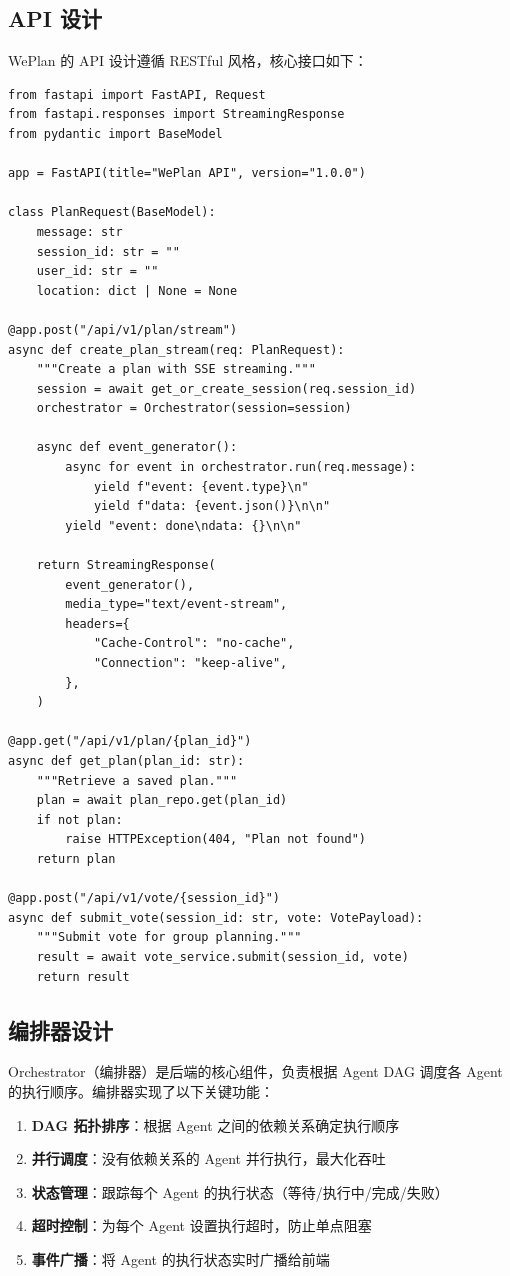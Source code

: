 \documentclass[12pt,a4paper]{ctexart}
\begin{document}
\subsection{API 设计}

WePlan 的 API 设计遵循 RESTful 风格，核心接口如下：

\begin{lstlisting}[caption={FastAPI 核心路由},label={lst:fastapi-routes}]
from fastapi import FastAPI, Request
from fastapi.responses import StreamingResponse
from pydantic import BaseModel

app = FastAPI(title="WePlan API", version="1.0.0")

class PlanRequest(BaseModel):
    message: str
    session_id: str = ""
    user_id: str = ""
    location: dict | None = None

@app.post("/api/v1/plan/stream")
async def create_plan_stream(req: PlanRequest):
    """Create a plan with SSE streaming."""
    session = await get_or_create_session(req.session_id)
    orchestrator = Orchestrator(session=session)

    async def event_generator():
        async for event in orchestrator.run(req.message):
            yield f"event: {event.type}\n"
            yield f"data: {event.json()}\n\n"
        yield "event: done\ndata: {}\n\n"

    return StreamingResponse(
        event_generator(),
        media_type="text/event-stream",
        headers={
            "Cache-Control": "no-cache",
            "Connection": "keep-alive",
        },
    )

@app.get("/api/v1/plan/{plan_id}")
async def get_plan(plan_id: str):
    """Retrieve a saved plan."""
    plan = await plan_repo.get(plan_id)
    if not plan:
        raise HTTPException(404, "Plan not found")
    return plan

@app.post("/api/v1/vote/{session_id}")
async def submit_vote(session_id: str, vote: VotePayload):
    """Submit vote for group planning."""
    result = await vote_service.submit(session_id, vote)
    return result
\end{lstlisting}

\subsection{编排器设计}

Orchestrator（编排器）是后端的核心组件，负责根据 Agent DAG 调度各 Agent 的执行顺序。编排器实现了以下关键功能：

\begin{enumerate}[leftmargin=2em]
  \item \textbf{DAG 拓扑排序}：根据 Agent 之间的依赖关系确定执行顺序
  \item \textbf{并行调度}：没有依赖关系的 Agent 并行执行，最大化吞吐
  \item \textbf{状态管理}：跟踪每个 Agent 的执行状态（等待/执行中/完成/失败）
  \item \textbf{超时控制}：为每个 Agent 设置执行超时，防止单点阻塞
  \item \textbf{事件广播}：将 Agent 的执行状态实时广播给前端
\end{enumerate}
\end{document}
